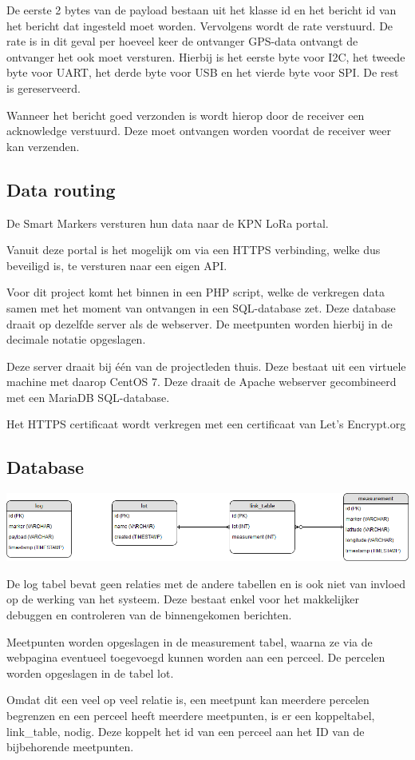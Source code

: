 De eerste 2 bytes van de payload bestaan uit het klasse id en het bericht id van
het bericht dat ingesteld moet worden. Vervolgens wordt de rate verstuurd. De
rate is in dit geval per hoeveel keer de ontvanger GPS-data ontvangt de
ontvanger het ook moet versturen.
Hierbij is het eerste byte voor I2C, het tweede byte voor UART, het derde byte
voor USB en het vierde byte voor SPI. De rest is gereserveerd.
\citep[p. 11]{UBlox8}

Wanneer het bericht goed verzonden is wordt hierop door de receiver een
acknowledge verstuurd. Deze moet ontvangen worden voordat de receiver weer
kan verzenden.

\subsection{Data routing}
De Smart Markers versturen hun data naar de KPN LoRa portal.

Vanuit deze portal is het mogelijk om via een HTTPS verbinding, welke dus beveiligd is,
te versturen naar een eigen API.

Voor dit project komt het binnen in een PHP script, welke de verkregen data samen met het
moment van ontvangen in een SQL-database zet. Deze database draait op dezelfde server als
de webserver. De meetpunten worden hierbij in de decimale notatie opgeslagen.

Deze server draait bij één van de projectleden thuis. Deze bestaat uit een virtuele
machine met daarop CentOS 7. Deze draait de Apache webserver gecombineerd met een
MariaDB SQL-database.

Het HTTPS certificaat wordt verkregen met een certificaat van Let's Encrypt.org

\subsection{Database}
\label{sec:database}
\includegraphics[width=\textwidth]{technical/erd.png}

De log tabel bevat geen relaties met de andere tabellen en is ook niet van
invloed op de werking van het systeem. Deze bestaat enkel voor het makkelijker
debuggen en controleren van de binnengekomen berichten.

Meetpunten worden opgeslagen in de measurement tabel, waarna ze via de webpagina
eventueel toegevoegd kunnen worden aan een perceel. De percelen worden opgeslagen
in de tabel lot.

Omdat dit een veel op veel relatie is, een meetpunt kan meerdere percelen begrenzen en
een perceel heeft meerdere meetpunten, is er een koppeltabel, link\_table, nodig.
Deze koppelt het id van een perceel aan het ID van de bijbehorende meetpunten.
